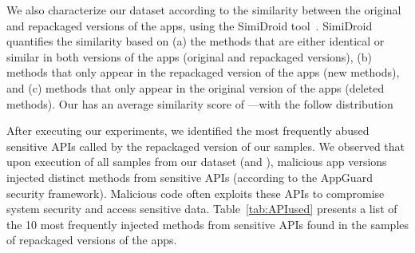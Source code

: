 We also characterize our dataset according to the similarity
between the original and repackaged versions of the apps, using the  
SimiDroid tool~\cite{DBLP:conf/trustcom/0029BK17}. SimiDroid quantifies the similarity
based on (a) the methods that are either identical or similar in both versions of the apps (original and repackaged versions),
(b) methods that only appear in the repackaged version of the apps (new methods), and (c) methods that only appear in the
original version of the apps (deleted methods).
Our \cds has an average similarity score of ---with the follow distribution 


After executing our experiments, we identified the  most frequently abused sensitive APIs called by the repackaged version of our samples.
We observed that upon execution of all samples from our dataset (\sds and \cds), malicious app versions injected  distinct methods from sensitive APIs (according to the
AppGuard~\cite{DBLP:conf/esorics/BackesGHMS13} security framework).
Malicious code often exploits these APIs to compromise system security and access sensitive data. Table~\ref{tab:APIused}
presents a list of the 10 most frequently injected methods from sensitive APIs found in the
\cds samples of repackaged versions of the apps.

